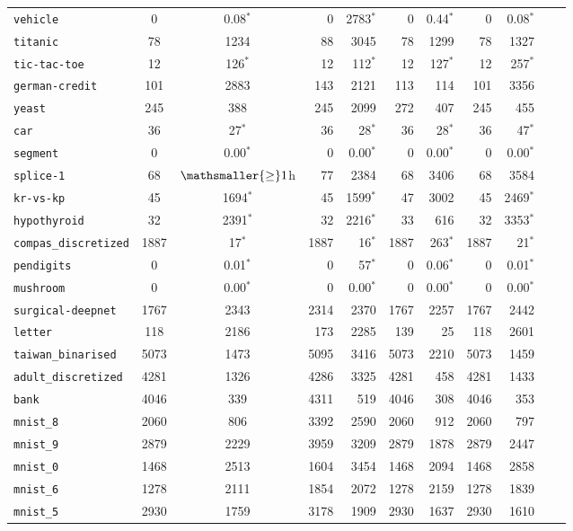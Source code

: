 \begin{tabular}{lccrrrrrrrr}
\texttt{vehicle} & 0 & 0.08$^*$ & 0 & 2783$^*$ & 0 & 0.44$^*$ & 0 & 0.08$^*$\\
\texttt{titanic} & 78 & 1234 & 88 & 3045 & 78 & 1299 & 78 & 1327\\
\texttt{tic-tac-toe} & 12 & 126$^*$ & 12 & 112$^*$ & 12 & 127$^*$ & 12 & 257$^*$\\
\texttt{german-credit} & 101 & 2883 & 143 & 2121 & 113 & 114 & 101 & 3356\\
\texttt{yeast} & 245 & 388 & 245 & 2099 & 272 & 407 & 245 & 455\\
\texttt{car} & 36 & 27$^*$ & 36 & 28$^*$ & 36 & 28$^*$ & 36 & 47$^*$\\
\texttt{segment} & 0 & 0.00$^*$ & 0 & 0.00$^*$ & 0 & 0.00$^*$ & 0 & 0.00$^*$\\
\texttt{splice-1} & 68 & $\mathsmaller{\geq}1$h & 77 & 2384 & 68 & 3406 & 68 & 3584\\
\texttt{kr-vs-kp} & 45 & 1694$^*$ & 45 & 1599$^*$ & 47 & 3002 & 45 & 2469$^*$\\
\texttt{hypothyroid} & 32 & 2391$^*$ & 32 & 2216$^*$ & 33 & 616 & 32 & 3353$^*$\\
\texttt{compas\_discretized} & 1887 & 17$^*$ & 1887 & 16$^*$ & 1887 & 263$^*$ & 1887 & 21$^*$\\
\texttt{pendigits} & 0 & 0.01$^*$ & 0 & 57$^*$ & 0 & 0.06$^*$ & 0 & 0.01$^*$\\
\texttt{mushroom} & 0 & 0.00$^*$ & 0 & 0.00$^*$ & 0 & 0.00$^*$ & 0 & 0.00$^*$\\
\texttt{surgical-deepnet} & 1767 & 2343 & 2314 & 2370 & 1767 & 2257 & 1767 & 2442\\
\texttt{letter} & 118 & 2186 & 173 & 2285 & 139 & 25 & 118 & 2601\\
\texttt{taiwan\_binarised} & 5073 & 1473 & 5095 & 3416 & 5073 & 2210 & 5073 & 1459\\
\texttt{adult\_discretized} & 4281 & 1326 & 4286 & 3325 & 4281 & 458 & 4281 & 1433\\
\texttt{bank} & 4046 & 339 & 4311 & 519 & 4046 & 308 & 4046 & 353\\
\texttt{mnist\_8} & 2060 & 806 & 3392 & 2590 & 2060 & 912 & 2060 & 797\\
\texttt{mnist\_9} & 2879 & 2229 & 3959 & 3209 & 2879 & 1878 & 2879 & 2447\\
\texttt{mnist\_0} & 1468 & 2513 & 1604 & 3454 & 1468 & 2094 & 1468 & 2858\\
\texttt{mnist\_6} & 1278 & 2111 & 1854 & 2072 & 1278 & 2159 & 1278 & 1839\\
\texttt{mnist\_5} & 2930 & 1759 & 3178 & 1909 & 2930 & 1637 & 2930 & 1610\\

\end{tabular}
